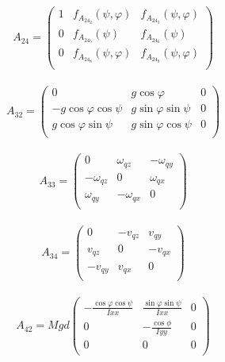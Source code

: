\begin{equation}
A_{24}=\left(\begin{array}{ccc}
1 & f_{A_{24_2}}(\psi,\varphi) & f_{A_{24_3}}(\psi,\varphi) \\
0 & f_{A_{24_5}}(\psi) & f_{A_{24_6}}(\psi) \\
0&f_{A_{24_8}}(\psi,\varphi)&f_{A_{24_9}}(\psi,\varphi)\\
\end{array}\right)
\end{equation}\\

\begin{equation}
A_{32}=\left(\begin{array}{ccc}
0 & g\cos \varphi & 0 \\
-g\cos \varphi \cos \psi & g\sin\varphi\sin\psi & 0 \\
 g\cos \varphi \sin \psi & g\sin\varphi\cos\psi & 0 \\
\end{array}\right)
\end{equation}\\

\begin{equation}
A_{33}=\left(\begin{array}{ccc}
0 & \omega_{qz} & -\omega_{qy} \\
-\omega_{qz} & 0 &\omega_{qx} \\
\omega_{qy} & -\omega_{qx}& 0 \\
\end{array}\right)
\end{equation}\\

\begin{equation}
A_{34}=\left(\begin{array}{ccc}
0 & -v_{qz} & v_{qy} \\
v_{qz} & 0 &-v_{qx} \\
-v_{qy} & v_{qx}& 0 \\
\end{array}\right)
\end{equation}\\

\begin{equation}
A_{42}=Mgd\left(\begin{array}{ccc}
-\frac{\cos\varphi\cos\psi}{I{xx}} & \frac{\sin\varphi\sin\psi}{I{xx}} & 0 \\
0 & -\frac{\cos\phi}{I{yy}} &0 \\
0 & 0& 0 \\
\end{array}\right)
\end{equation}\\

